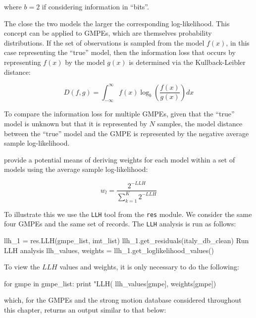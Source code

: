 \noindent where $b=2$ if considering information in ``bits''.

The close the two models the larger the corresponding log-likelihood. This concept can be applied to GMPEs, which are themselves probability distributions. If the set of observations is sampled from the model $f \left( x \right)$, in this case representing the ``true'' model, then the information loss that occurs by representing $f \left( x \right)$ by the model $g \left( x \right)$ is determined via the Kullback-Leibler distance:

\begin{equation}
D \left( {f, g} \right) = \int_{-\infty}^{\infty} f \left( x \right) \log_b \left( {\frac{f \left( x \right)}{g \left( x \right)}} \right) dx
\end{equation}

To compare the information loss for multiple GMPEs, given that the ``true'' model is unknown but that it is represented by $N$ samples, the model distance between the ``true'' model and the GMPE is represented by the negative average sample log-likelihood.

\textcite{Scherbaum_etal2009} provide a potential means of deriving weights for each model within a set of models using the average sample log-likelihood:  

\begin{equation}
w_l = \frac{2^{-LLH}}{\sum_{k=1}^{K}2 ^{-LLH}}
\end{equation}


To illustrate this we use the \verb=LLH= tool from the \verb=res= module. We consider the same four GMPEs and the same set of records. The \verb=LLH= analysis is run as follows:

\begin{python}[frame=single]
llh_1 = res.LLH(gmpe_list, imt_list)
llh_1.get_residuals(italy_db_clean)
 Run LLH analysis
llh_values, weights = llh_1.get_loglikelihood_values()
\end{python}

To view the $LLH$ values and weights, it is only necessary to do the following:

\begin{python}
for gmpe in gmpe_list:
    print "LLH(%
                                               llh_values[gmpe],     
                                               weights[gmpe])
\end{python}

\noindent which, for the GMPEs and the strong motion database considered throughout this chapter, returns an output similar to that below:

